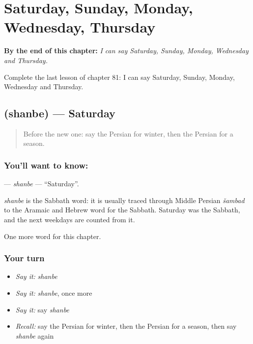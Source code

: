 
\chapter{Saturday, Sunday, Monday, Wednesday, Thursday}
\label{ch:fa-saturday-sunday-monday-wednesday-thursday}

\begin{chapteropening}
\textbf{By the end of this chapter:} \emph{I can say Saturday, Sunday, Monday, Wednesday and Thursday.}

Complete the last lesson of chapter 81: I can say Saturday, Sunday, Monday, Wednesday and Thursday.
\end{chapteropening}

\section[\texorpdfstring{\fa{شنبه} (shanbe)}{شنبه (shanbe)}]{ (shanbe) — Saturday}

\label{lesson:FA-C81-shanbe}



\begin{quote}
Before the new one: say the Persian for winter, then the Persian for a season.
\end{quote}

\subsection*{You'll want to know: }
\textbf{} — \emph{shanbe} — \textquotedblleft{}Saturday\textquotedblright{}.

\begin{cousinweb}
\emph{shanbe} is the Sabbath word: it is usually traced through Middle Persian \emph{šambad} to the Aramaic and Hebrew word for the Sabbath. Saturday was the Sabbath, and the next weekdays are counted from it.
\end{cousinweb}

\begin{grammarlens}[title={What you've built}]
One more word for this chapter.
\end{grammarlens}

\subsection*{Your turn}
\begin{itemize}
\raggedright
  \item \emph{Say it:} \emph{shanbe}
  \item \emph{Say it:} \emph{shanbe}, once more
  \item \emph{Say it:} say \emph{shanbe}
  \item \emph{Recall:} say the Persian for winter, then the Persian for a season, then say \emph{shanbe} again
\end{itemize}

